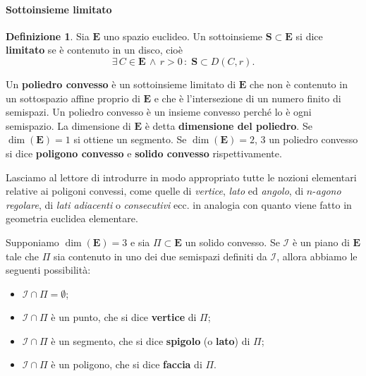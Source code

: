 \documentclass{article}
\theoremstyle{plain}
\theoremstyle{definition}
\newtheorem{defn}{Definizione}[section]
\theoremstyle{remark}
\begin{document}
\vspace{10pt}

\paragraph{Sottoinsieme limitato}
\begin{bxthm}
\begin{defn}
Sia $\mathbf{E}$ uno spazio euclideo. Un sottoinsieme $\mathbf{S} \subset \mathbf{E}$ si dice \textbf{limitato} se è 
contenuto in un disco, cioè
\[\exists\,C \in \mathbf{E}\,\land\,r>0\,:\;\mathbf{S} \subset D(C, r).\]
\end{defn}
\end{bxthm}

\vspace{10pt}

Un \textbf{poliedro convesso} è un sottoinsieme limitato di $\mathbf{E}$ che non è contenuto in un sottospazio 
affine proprio di $\mathbf{E}$ e che è l'intersezione di un numero finito di semispazi. Un poliedro convesso 
è un insieme convesso perché lo è ogni semispazio. La dimensione di $\mathbf{E}$ è detta 
\textbf{dimensione del poliedro}. Se $\dim(\mathbf{E}) = 1$ si ottiene un segmento. Se $\dim(\mathbf{E}) = 2$, 3 
un poliedro convesso si dice \textbf{poligono convesso} e \textbf{solido convesso} rispettivamente.

\vspace{10pt}

Lasciamo al lettore di introdurre in modo appropriato tutte le nozioni elementari relative ai poligoni convessi, 
come quelle di \emph{vertice}, \emph{lato} ed \emph{angolo}, di $n$-\emph{agono regolare}, di \emph{lati adiacenti} 
o \emph{consecutivi} ecc. in analogia con quanto viene fatto in geometria euclidea elementare.

\vspace{10pt}

Supponiamo $\dim(\mathbf{E}) = 3$ e sia $\Pi \subset \mathbf{E}$ un solido convesso. Se $\mathscr{I}$ è un 
piano di $\mathbf{E}$ tale che $\Pi$ sia contenuto in uno dei due semispazi definiti da $\mathscr{I}$, allora 
abbiamo le seguenti possibilità:
\begin{itemize}
\item $\mathscr{I}\cap\Pi = \emptyset$;
\item $\mathscr{I}\cap\Pi$ è un punto, che si dice \textbf{vertice} di $\Pi$;
\item $\mathscr{I}\cap\Pi$ è un segmento, che si dice \textbf{spigolo} (o \textbf{lato}) di $\Pi$;
\item $\mathscr{I}\cap\Pi$ è un poligono, che si dice \textbf{faccia} di $\Pi$.
\end{itemize}
\end{document}
